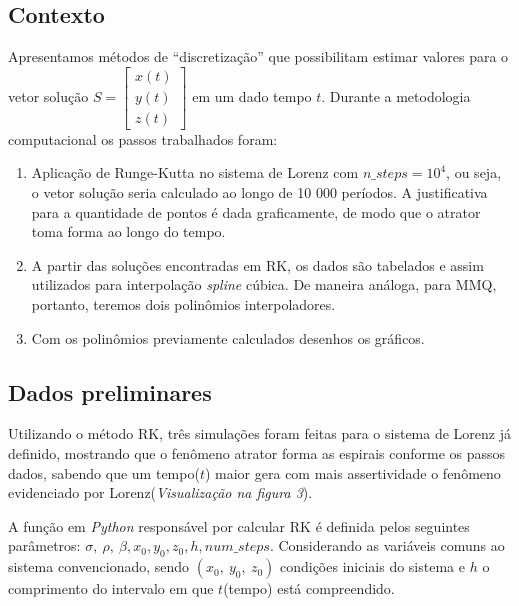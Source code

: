 \documentclass[12pt, a4paper]{article}
\begin{document}
\subsection{Contexto}
Apresentamos métodos de ``discretização'' que possibilitam estimar valores
para o vetor solução $S = \begin{bmatrix} x(t) \\ y(t) \\ z(t)\end{bmatrix}$ em
um dado tempo $t$. Durante a metodologia computacional os passos trabalhados
foram:
\begin{enumerate}
    \item Aplicação de Runge-Kutta no sistema de Lorenz com $n\_steps =
              10^4$, ou seja, o vetor solução seria calculado ao longo de 10
          000 períodos. A
          justificativa para a quantidade de pontos é dada graficamente, de
          modo que o
          atrator toma forma ao longo do tempo.
    \item A partir das soluções encontradas em RK, os dados são tabelados e
          assim utilizados para interpolação \textit{spline} cúbica. De maneira
          análoga,
          para MMQ, portanto, teremos dois polinômios interpoladores.
    \item Com os polinômios previamente calculados desenhos os gráficos.
\end{enumerate}

\subsection{Dados preliminares}
Utilizando o método RK, três simulações foram feitas para o sistema de
Lorenz já definido, mostrando que o fenômeno atrator forma as espirais conforme
os passos dados, sabendo que um tempo($t$) maior gera com mais assertividade o
fenômeno evidenciado por Lorenz(\textit{Visualização na figura 3}).

A função em \textit{Python} responsável por calcular RK é definida pelos
seguintes parâmetros: $\sigma,\ \rho,\ \beta, x_0, y_0, z_0, h, num\_steps$.
Considerando as variáveis comuns ao sistema convencionado, sendo $(x_0,\ y_0,\
    z_0)$ condições iniciais do sistema e $h$ o comprimento do intervalo em que
$t$(tempo) está compreendido.
\end{document}
